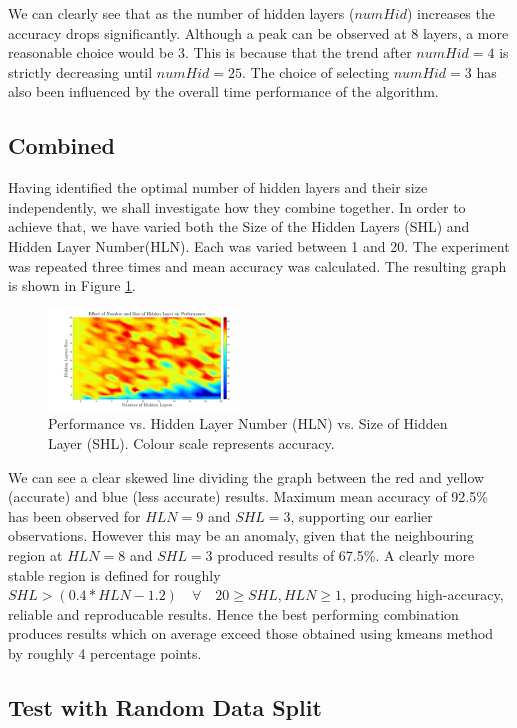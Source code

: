 \documentclass[10pt,twocolumn,letterpaper]{article}
\begin{document}
We can clearly see that as the number of hidden layers ($numHid$) increases the accuracy drops significantly. Although a peak can be observed at 8 layers, a more reasonable choice would be 3. This is because that the trend after $numHid = 4$ is strictly decreasing until $numHid = 25$. The choice of selecting $numHid = 3$ has also been influenced by the overall time performance of the algorithm.

\subsection{Combined}

Having identified the optimal number of hidden layers and their size independently, we shall investigate how they combine together. In order to achieve that, we have varied both the Size of the Hidden Layers (SHL) and Hidden Layer Number(HLN). Each was varied between 1 and 20. The experiment was repeated three times and mean accuracy was calculated. The resulting graph is shown in Figure \ref{fig:NNSizeNum}.

\begin{figure}
\centering
\includegraphics[width=0.45\textwidth]{../results/NN_HidLay_Num_Size4}
\caption{Performance vs. Hidden Layer Number (HLN) vs. Size of Hidden Layer (SHL). Colour scale represents accuracy.
\label{fig:NNSizeNum}}
\end{figure}

We can see a clear skewed line dividing the graph between the red and yellow (accurate) and blue (less accurate) results. Maximum mean accuracy of 92.5\% has been observed for $HLN = 9$ and $SHL = 3$, supporting our earlier observations. However this may be an anomaly, given that the neighbouring region at $HLN = 8$ and $SHL = 3$ produced results of 67.5\%. A clearly more stable region is defined for roughly $SHL > (0.4*HLN-1.2) \quad \forall \quad 20 \geq SHL, HLN \geq 1$, producing high-accuracy, reliable and reproducable results. Hence the best performing combination produces results which on average exceed those obtained using kmeans method by roughly 4 percentage points.

\subsection{Test with Random Data Split}
\end{document}
